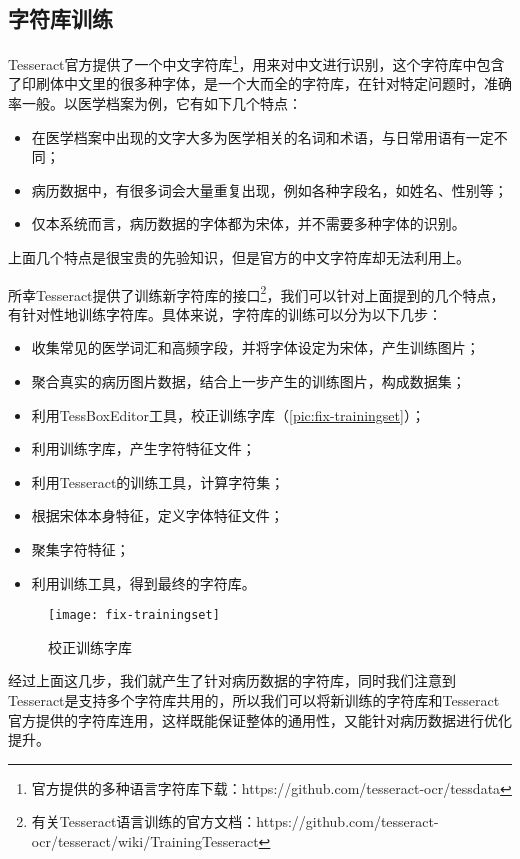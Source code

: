 \subsection{字符库训练}
Tesseract官方提供了一个中文字符库\footnote{官方提供的多种语言字符库下载：https://github.com/tesseract-ocr/tessdata}，用来对中文进行识别，这个字符库中包含了印刷体中文里的很多种字体，是一个大而全的字符库，在针对特定问题时，准确率一般。以医学档案为例，它有如下几个特点：
\begin{itemize}
	\item 在医学档案中出现的文字大多为医学相关的名词和术语，与日常用语有一定不同；
	\item 病历数据中，有很多词会大量重复出现，例如各种字段名，如姓名、性别等；
	\item 仅本系统而言，病历数据的字体都为宋体，并不需要多种字体的识别。
\end{itemize}
上面几个特点是很宝贵的先验知识，但是官方的中文字符库却无法利用上。

所幸Tesseract提供了训练新字符库的接口\footnote{有关Tesseract语言训练的官方文档：https://github.com/tesseract-ocr/tesseract/wiki/TrainingTesseract}，我们可以针对上面提到的几个特点，有针对性地训练字符库。具体来说，字符库的训练可以分为以下几步：
\begin{itemize}
	\item 收集常见的医学词汇和高频字段，并将字体设定为宋体，产生训练图片；
	\item 聚合真实的病历图片数据，结合上一步产生的训练图片，构成数据集；
	\item 利用TessBoxEditor工具，校正训练字库（\autoref{pic:fix-trainingset}）；
	\item 利用训练字库，产生字符特征文件；
	\item 利用Tesseract的训练工具，计算字符集；
	\item 根据宋体本身特征，定义字体特征文件；
	\item 聚集字符特征；
	\item 利用训练工具，得到最终的字符库。
\end{itemize}

\begin{figure}
	\centering
	\texttt{[image: fix-trainingset]}
	\caption{校正训练字库}
	\label{pic:fix-trainingset}
\end{figure}
经过上面这几步，我们就产生了针对病历数据的字符库，同时我们注意到Tesseract是支持多个字符库共用的，所以我们可以将新训练的字符库和Tesseract官方提供的字符库连用，这样既能保证整体的通用性，又能针对病历数据进行优化提升。

